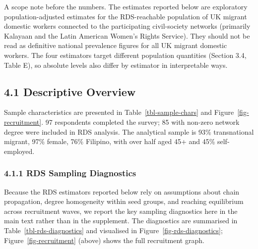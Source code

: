 \documentclass[
  12pt,
  letterpaper,
  DIV=11,
  numbers=noendperiod]{scrartcl}
\begin{document}
A scope note before the numbers. The estimates reported below are
exploratory population-adjusted estimates for the RDS-reachable
population of UK migrant domestic workers connected to the participating
civil-society networks (primarily Kalayaan and the Latin American
Women's Rights Service). They should not be read as definitive national
prevalence figures for all UK migrant domestic workers. The four
estimators target different population quantities (Section 3.4, Table
E), so absolute levels also differ by estimator in interpretable ways.

\subsection{4.1 Descriptive Overview}\label{descriptive-overview}

Sample characteristics are presented in Table~\ref{tbl-sample-chars} and
Figure~\ref{fig-recruitment}. 97 respondents completed the survey; 85
with non-zero network degree were included in RDS analysis. The
analytical sample is 93\% transnational migrant, 97\% female, 76\%
Filipino, with over half aged 45+ and 45\% self-employed.

\subsubsection{4.1.1 RDS Sampling
Diagnostics}\label{rds-sampling-diagnostics}

Because the RDS estimators reported below rely on assumptions about
chain propagation, degree homogeneity within seed groups, and reaching
equilibrium across recruitment waves, we report the key sampling
diagnostics here in the main text rather than in the supplement. The
diagnostics are summarised in Table~\ref{tbl-rds-diagnostics} and
visualised in Figure~\ref{fig-rds-diagnostics};
Figure~\ref{fig-recruitment} (above) shows the full recruitment graph.
\end{document}
